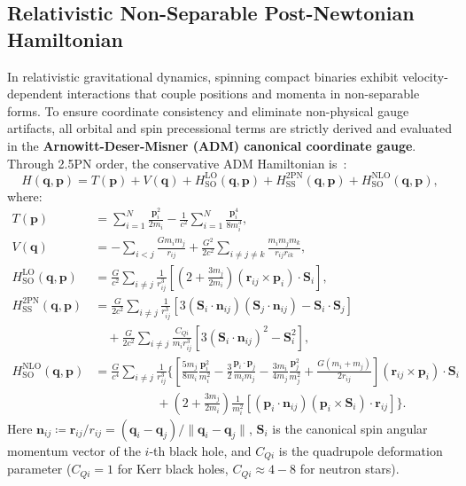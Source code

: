 \documentclass[11pt,a4paper,reqno]{article}
\theoremstyle{plain}
\theoremstyle{definition}
\theoremstyle{remark}
\numberwithin{equation}{section}
\begin{document}
\subsection{Relativistic Non-Separable Post-Newtonian Hamiltonian}
In relativistic gravitational dynamics, spinning compact binaries exhibit velocity-dependent interactions that couple positions and momenta in non-separable forms. To ensure coordinate consistency and eliminate non-physical gauge artifacts, all orbital and spin precessional terms are strictly derived and evaluated in the \textbf{Arnowitt-Deser-Misner (ADM) canonical coordinate gauge}. Through 2.5PN order, the conservative ADM Hamiltonian is~\cite{DamourJaranowskiSchafer2008,FayeBlanchetBuonanno2006}:
\begin{equation}
H(\bm{q}, \bm{p}) = T(\bm{p}) + V(\bm{q}) + H_{\mathrm{SO}}^{\mathrm{LO}}(\bm{q}, \bm{p}) + H_{\mathrm{SS}}^{\mathrm{2PN}}(\bm{q}, \bm{p}) + H_{\mathrm{SO}}^{\mathrm{NLO}}(\bm{q}, \bm{p}),
\label{eq:total_hamiltonian}
\end{equation}
where:
\begin{align}
T(\bm{p}) &= \sum_{i=1}^N \frac{\bm{p}_i^2}{2 m_i} - \frac{1}{c^2} \sum_{i=1}^N \frac{\bm{p}_i^4}{8 m_i^3}, \label{eq:kinetic_pn} \\
V(\bm{q}) &= -\sum_{i < j} \frac{G m_i m_j}{r_{ij}} + \frac{G^2}{2 c^2} \sum_{i \neq j \neq k} \frac{m_i m_j m_k}{r_{ij} r_{ik}}, \label{eq:potential_pn} \\
H_{\mathrm{SO}}^{\mathrm{LO}}(\bm{q}, \bm{p}) &= \frac{G}{c^2} \sum_{i \neq j} \frac{1}{r_{ij}^3} \left[ \left(2 + \frac{3 m_j}{2 m_i}\right) (\bm{r}_{ij} \times \bm{p}_i) \cdot \bm{S}_i \right], \label{eq:so_lo} \\
H_{\mathrm{SS}}^{\mathrm{2PN}}(\bm{q}, \bm{p}) &= \frac{G}{2 c^2} \sum_{i \neq j} \frac{1}{r_{ij}^3} \left[ 3 (\bm{S}_i \cdot \bm{n}_{ij})(\bm{S}_j \cdot \bm{n}_{ij}) - \bm{S}_i \cdot \bm{S}_j \right] \nonumber \\
&\quad + \frac{G}{2 c^2} \sum_{i \neq j} \frac{C_{Qi}}{m_i r_{ij}^3} \left[ 3 (\bm{S}_i \cdot \bm{n}_{ij})^2 - \bm{S}_i^2 \right], \label{eq:ss_2pn} \\
H_{\mathrm{SO}}^{\mathrm{NLO}}(\bm{q}, \bm{p}) &= \frac{G}{c^4} \sum_{i \neq j} \frac{1}{r_{ij}^3} \Bigg\{ \left[ \frac{5 m_j}{8 m_i} \frac{\bm{p}_i^2}{m_i^2} - \frac{3}{2} \frac{\bm{p}_i \cdot \bm{p}_j}{m_i m_j} - \frac{3 m_i}{4 m_j} \frac{\bm{p}_j^2}{m_j^2} + \frac{G(m_i + m_j)}{2 r_{ij}} \right] (\bm{r}_{ij} \times \bm{p}_i) \cdot \bm{S}_i \nonumber \\
&\qquad\qquad\quad + \left( 2 + \frac{3 m_j}{2 m_i} \right) \frac{1}{m_i^2} \left[ (\bm{p}_i \cdot \bm{n}_{ij}) (\bm{p}_i \times \bm{S}_i) \cdot \bm{r}_{ij} \right] \Bigg\}. \label{eq:so_nlo}
\end{align}
Here $\bm{n}_{ij} \coloneqq \bm{r}_{ij} / r_{ij} = (\bm{q}_i - \bm{q}_j) / \|\bm{q}_i - \bm{q}_j\|$, $\bm{S}_i$ is the canonical spin angular momentum vector of the $i$-th black hole, and $C_{Qi}$ is the quadrupole deformation parameter ($C_{Qi} = 1$ for Kerr black holes, $C_{Qi} \approx 4 - 8$ for neutron stars).
\end{document}
